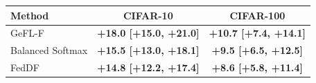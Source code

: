 \begin{tabular}{lcc}
\toprule
Method & CIFAR-10 & CIFAR-100\\
\midrule
GeFL-F & \textbf{+18.0 [+15.0, +21.0]} & \textbf{+10.7 [+7.4, +14.1]}\\
Balanced Softmax & \textbf{+15.5 [+13.0, +18.1]} & \textbf{+9.5 [+6.5, +12.5]}\\
FedDF & \textbf{+14.8 [+12.2, +17.4]} & \textbf{+8.6 [+5.8, +11.4]}\\
\bottomrule
\end{tabular}
